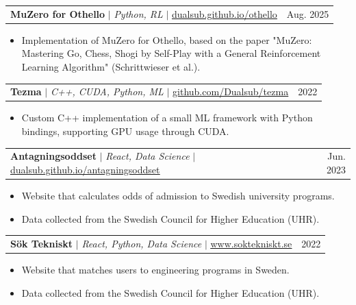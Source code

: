 \documentclass[a4paper,11pt]{article}
\makeatletter
\newcommand{\resumeItem}[1]{
  \item\small{
    {#1 \vspace{-2pt}}
  }
}
\newcommand{\resumeProjectHeading}[2]{
    \item
    \begin{tabular*}{0.97\textwidth}{l@{\extracolsep{\fill}}r}
      \small#1 & #2 \\
    \end{tabular*}\vspace{-7pt}
}
\newcommand{\resumeItemListStart}{\begin{itemize}}
\newcommand{\resumeItemListEnd}{\end{itemize}\vspace{-5pt}}
\makeatother
\begin{document}
\resumeProjectHeading
{\textbf{MuZero for Othello} $|$ \emph{Python, RL} $|$ \href{https://dualsub.github.io/othello/}{\underline{dualsub.github.io/othello}}}{Aug. 2025}
\resumeItemListStart
\resumeItem{Implementation of MuZero for Othello, based on the paper "MuZero: Mastering Go, Chess, Shogi by Self-Play with a General Reinforcement Learning Algorithm" (Schrittwieser et al.).}
\resumeItemListEnd

\resumeProjectHeading
{\textbf{Tezma} $|$ \emph{C++, CUDA, Python, ML} $|$ \href{https://github.com/Dualsub/tezma}{\underline{github.com/Dualsub/tezma}}}{2022}
\resumeItemListStart
\resumeItem{Custom C++ implementation of a small ML framework with Python bindings, supporting GPU usage through CUDA.}
\resumeItemListEnd

\resumeProjectHeading
{\textbf{Antagningsoddset} $|$ \emph{React, Data Science} $|$ \href{https://dualsub.github.io/antagningsoddset/}{\underline{dualsub.github.io/antagningsoddset}}}{Jun. 2023}
\resumeItemListStart
\resumeItem{Website that calculates odds of admission to Swedish university programs.}
\resumeItem{Data collected from the Swedish Council for Higher Education (UHR).}
\resumeItemListEnd

\resumeProjectHeading
{\textbf{S\"ok Tekniskt} $|$ \emph{React, Python, Data Science} $|$ \href{https://www.soktekniskt.se}{\underline{www.soktekniskt.se}}}{2022}
\resumeItemListStart
\resumeItem{Website that matches users to engineering programs in Sweden.}
\resumeItem{Data collected from the Swedish Council for Higher Education (UHR).}
\resumeItemListEnd

%

\end{document}
